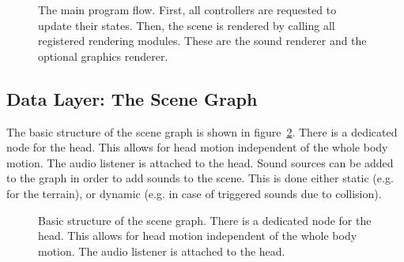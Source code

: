 \documentclass{article}
\begin{document}
\begin{figure}
\centering
{}
\caption{The main program flow. First, all controllers are requested to update
their states. Then, the scene is rendered by calling all registered rendering
modules. These are the sound renderer and the optional graphics renderer.}
\label{fig:mainloop}
\end{figure}

\subsection{Data Layer: The Scene Graph}

The basic structure of the scene graph is shown in figure~\ref{fig:graph}.
There is a dedicated node for the head. This allows for head motion independent
of the whole body motion. The audio listener is attached to the head. Sound
sources can be added to the graph in order to add sounds to the scene. This is
done either static (e.g. for the terrain), or dynamic (e.g. in case of
triggered sounds due to collision).

\begin{figure}
\centering
{}

\caption{Basic structure of the scene graph. There is a dedicated node for the
head. This allows for head motion independent of the whole body motion. The
audio listener is attached to the head.}
\label{fig:graph}
\end{figure}
\end{document}
